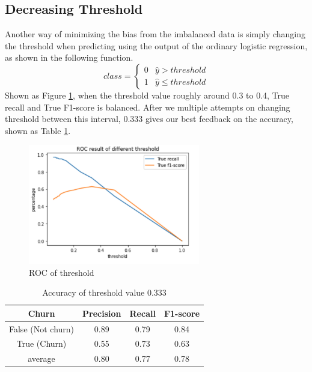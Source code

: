 \documentclass{article}
\begin{document}
\subsection{Decreasing Threshold}
Another way of minimizing the bias from the imbalanced data is simply changing the threshold when predicting using the output of the ordinary logistic regression, as shown in the following function.
\[ class = \begin{cases} 
      			0 & \hat{y}> threshold \\
      			1 & \hat{y}\leq threshold 
  			   \end{cases}
\]
Shown as Figure \ref{fig:threshold}, when the threshold value roughly around 0.3 to 0.4, True recall and True F1-score is balanced. After we multiple attempts on changing threshold between this interval, 0.333 gives our best feedback on the accuracy, shown as Table \ref{threshold}.
\FloatBarrier
\begin{figure}[htb]
\centering
    \includegraphics[width=7.5cm]{Threshold}
    \caption{ROC of threshold}
    \label{fig:threshold}
\end{figure}
\FloatBarrier
\begin{table}[htb]
\centering
\caption{Accuracy of threshold value 0.333}
	\begin{tabular}{||c c c c ||} 
	 \hline
 	Churn & Precision & Recall & F1-score  \\ [0.5ex] 
 	\hline\hline
 	False (Not churn) & 0.89 & 0.79 & 0.84 \\ 
 	True (Churn) & 0.55 & 0.73 & 0.63 \\
   	average & 0.80 & 0.77 & 0.78 \\
 	\hline
	\end{tabular}\label{threshold}
\end{table}
\FloatBarrier
\end{document}
